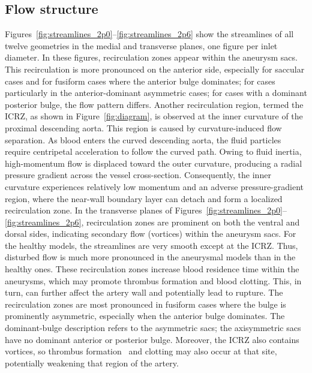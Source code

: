 \documentclass[12pt,a4paper]{article}
\newcommand{\cfdrevision}[1]{#1} %
\newcommand{\ICRZ}{\ac{ICRZ}\xspace}
\theoremstyle{definition}
\numberwithin{equation}{section}
\providecommand{\DIFaddtex}[1]{{\protect\color{blue} \sf #1}} %
\providecommand{\DIFdeltex}[1]{{\protect\color{red} \scriptsize #1}} %
\providecommand{\DIFaddbegin}{} %
\providecommand{\DIFaddend}{} %
\providecommand{\DIFdelbegin}{} %
\providecommand{\DIFdelend}{} %
\providecommand{\DIFadd}[1]{\texorpdfstring{\DIFaddtex{#1}}{#1}} %
\providecommand{\DIFdel}[1]{\texorpdfstring{\DIFdeltex{#1}}{}} %
\newcommand{\DIFscaledelfig}{0.5}
\newlength{\DIFdelgraphicswidth} %
\newlength{\DIFdelgraphicsheight} %
\newcommand{\DIFaddincludegraphics}[2][]{{\color{blue}\fbox{\DIFOincludegraphics[#1]{#2}}}} %
\newcommand{\DIFdelincludegraphics}[2][]{%
\sbox{\DIFdelgraphicsbox}{\DIFOincludegraphics[#1]{#2}}%
\settoboxwidth{\DIFdelgraphicswidth}{\DIFdelgraphicsbox} %
\settoboxtotalheight{\DIFdelgraphicsheight}{\DIFdelgraphicsbox} %
\scalebox{\DIFscaledelfig}{%
\parbox[b]{\DIFdelgraphicswidth}{\usebox{\DIFdelgraphicsbox}\\[-\baselineskip] \rule{\DIFdelgraphicswidth}{0em}}\llap{\resizebox{\DIFdelgraphicswidth}{\DIFdelgraphicsheight}{%
\setlength{\unitlength}{\DIFdelgraphicswidth}%
\begin{picture}(1,1)%
\thicklines\linethickness{2pt} %
{\color[rgb]{1,0,0}\put(0,0){\framebox(1,1){}}}%
{\color[rgb]{1,0,0}\put(0,0){\line( 1,1){1}}}%
{\color[rgb]{1,0,0}\put(0,1){\line(1,-1){1}}}%
\end{picture}%
}\hspace*{3pt}}} %
} %
\DeclareRobustCommand{\DIFaddbegin}{\DIFOaddbegin \let\includegraphics\DIFaddincludegraphics} %
\DeclareRobustCommand{\DIFaddend}{\DIFOaddend \let\includegraphics\DIFOincludegraphics} %
\DeclareRobustCommand{\DIFdelbegin}{\DIFOdelbegin \let\includegraphics\DIFdelincludegraphics} %
\DeclareRobustCommand{\DIFdelend}{\DIFOaddend \let\includegraphics\DIFOincludegraphics} %
\begin{document}
\subsection{Flow structure}
Figures~\ref{fig:streamlines_2p0}--\ref{fig:streamlines_2p6} show the streamlines of all twelve geometries in the medial and transverse planes, one figure per inlet diameter. In these figures, recirculation zones appear within the aneurysm sacs. This recirculation is more pronounced on the anterior side, \DIFdelbegin \DIFdel{especially for saccular cases and for fusiform cases where the anterior bulge dominates; for cases }\DIFdelend \DIFaddbegin \DIFadd{\cfdrevision{particularly in the anterior-dominant asymmetric cases;} for cases }\DIFaddend with a dominant posterior bulge, the flow pattern differs. Another recirculation region, termed the \ICRZ, as shown in Figure~\ref{fig:diagram}, is observed at the inner curvature of the proximal descending aorta. This region is caused by curvature-induced flow separation. As blood enters the curved descending aorta, the fluid particles require centripetal acceleration to follow the curved path. Owing to fluid inertia, high-momentum flow is displaced toward the outer curvature, producing a radial pressure gradient across the vessel cross-section. Consequently, the inner curvature experiences relatively low momentum and an adverse pressure-gradient region, where the near-wall boundary layer can detach and form a localized recirculation zone. In the transverse planes of Figures~\ref{fig:streamlines_2p0}--\ref{fig:streamlines_2p6}, recirculation zones are prominent on both the ventral and dorsal sides, indicating secondary flow (vortices) within the aneurysm sacs. For the healthy models, the streamlines are very smooth except at the \ICRZ. Thus, disturbed flow is much more pronounced in the aneurysmal models than in the healthy ones. These recirculation zones increase blood residence time within the aneurysms, which may promote thrombus formation and blood clotting. This, in turn, can further affect the artery wall and potentially lead to rupture. \DIFdelbegin \DIFdel{The recirculation zones are most pronounced in fusiform cases where the bulge is prominently asymmetric, especially when the anterior bulge dominates. }\DIFdelend \DIFaddbegin \DIFadd{\cfdrevision{The dominant-bulge description refers to the asymmetric sacs; the axisymmetric sacs have no dominant anterior or posterior bulge.} }\DIFaddend Moreover, the \ICRZ also contains vortices, so thrombus formation~\cite{salman2019biomechanical} and clotting may also occur at that site, potentially weakening that region of the artery.
\end{document}
